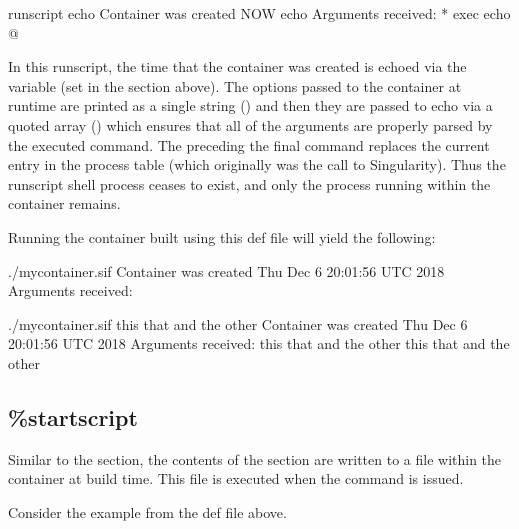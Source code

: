 \documentclass[letterpaper,10pt,english]{sphinxmanual}
\begin{document}
%
\begin{sphinxVerbatim}[commandchars=\\\{\}]
\PYGZpc{}runscript
    echo \PYGZdq{}Container was created \PYGZdl{}NOW\PYGZdq{}
    echo \PYGZdq{}Arguments received: \PYGZdl{}*\PYGZdq{}
    exec echo \PYGZdq{}\PYGZdl{}@\PYGZdq{}
\end{sphinxVerbatim}

In this runscript, the time that the container was created is echoed via the
 variable (set in the  section above). The options passed to
the container at runtime are printed as a single string (\sphinxcode{\sphinxupquote{\$*}}) and then they
are passed to echo via a quoted array () which ensures that all of the
arguments are properly parsed by the executed command. The  preceding
the final  command replaces the current entry in the process table
(which originally was the call to Singularity). Thus the runscript shell process
ceases to exist, and only the process running within the container remains.

Running the container built using this def file will yield the following:

%
\begin{sphinxVerbatim}[commandchars=\\\{\}]
\PYGZdl{} ./my\PYGZus{}container.sif
Container was created Thu Dec  6 20:01:56 UTC 2018
Arguments received:

\PYGZdl{} ./my\PYGZus{}container.sif this that and the other
Container was created Thu Dec  6 20:01:56 UTC 2018
Arguments received: this that and the other
this that and the other
\end{sphinxVerbatim}


\subsection{\%startscript}
\label{\detokenize{definition_files:startscript}}\label{\detokenize{definition_files:sec-help}}
Similar to the  section, the contents of the 
section are written to a file within the container at build time.  This file is
executed when the  command is issued.

Consider the example from the def file above.
\end{document}
